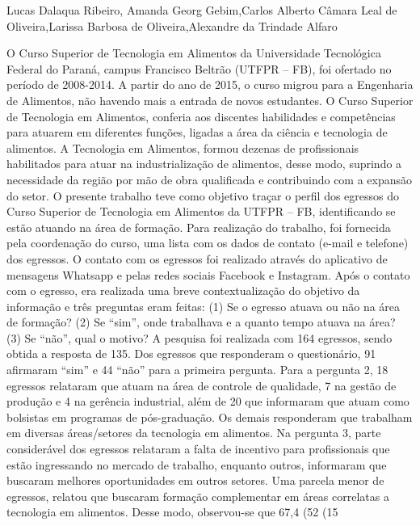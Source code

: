 Lucas Dalaqua Ribeiro, Amanda Georg Gebim,Carlos Alberto Câmara Leal de Oliveira,Larissa Barbosa de Oliveira,Alexandre da Trindade Alfaro

O Curso Superior de Tecnologia em Alimentos da Universidade Tecnológica Federal do Paraná, 
campus Francisco Beltrão (UTFPR – FB), foi ofertado no período de 2008-2014. A partir do ano 
de 2015, o curso migrou para a Engenharia de Alimentos, não havendo mais a entrada de novos 
estudantes. O Curso Superior de Tecnologia em Alimentos, conferia aos discentes habilidades e 
competências para atuarem em diferentes funções, ligadas a área da ciência e tecnologia de 
alimentos. A Tecnologia em Alimentos, formou dezenas de profissionais habilitados para atuar na 
industrialização de alimentos, desse modo, suprindo a necessidade da região por mão de obra 
qualificada e contribuindo com a expansão do setor. O presente trabalho teve como objetivo traçar 
o perfil dos egressos do Curso Superior de Tecnologia em Alimentos da UTFPR – FB, 
identificando se estão atuando na área de formação. Para realização do trabalho, foi fornecida pela 
coordenação do curso, uma lista com os dados de contato (e-mail e telefone) dos egressos. O 
contato com os egressos foi realizado através do aplicativo de mensagens Whatsapp e pelas redes 
sociais Facebook e Instagram. Após o contato com o egresso, era realizada uma breve 
contextualização do objetivo da informação e três preguntas eram feitas: (1) Se o egresso atuava 
ou não na área de formação? (2) Se “sim”, onde trabalhava e a quanto tempo atuava na área? (3) 
Se “não”, qual o motivo? A pesquisa foi realizada com 164 egressos, sendo obtida a resposta de 
135. Dos egressos que responderam o questionário, 91 afirmaram “sim” e 44 “não” para a primeira 
pergunta. Para a pergunta 2, 18 egressos relataram que atuam na área de controle de qualidade, 7 
na gestão de produção e 4 na gerência industrial, além de 20 que informaram que atuam como 
bolsistas em programas de pós-graduação. Os demais responderam que trabalham em diversas 
áreas/setores da tecnologia em alimentos. Na pergunta 3, parte considerável dos egressos relataram 
a falta de incentivo para profissionais que estão ingressando no mercado de trabalho, enquanto
outros, informaram que buscaram melhores oportunidades em outros setores. Uma parcela menor 
de egressos, relatou que buscaram formação complementar em áreas correlatas a tecnologia em 
alimentos. Desse modo, observou-se que 67,4%
(52%
(15%

